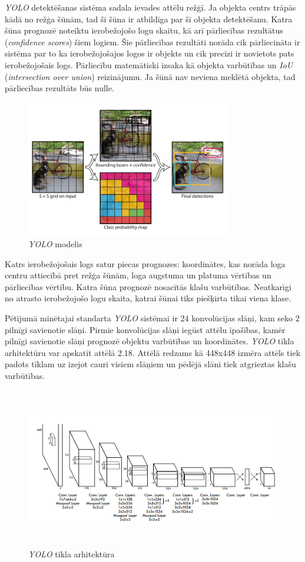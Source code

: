 \textit{YOLO} detektēšanas sistēma sadala ievades attēlu režģī. Ja objekta centrs trāpās kādā no režģa šūnām, tad šī šūna ir atbildīga par šī objekta detektēšanu. Katra šūna prognozē noteiktu ierobežojošo logu skaitu, kā arī pārliecības rezultātus (\textit{confidence scores}) šiem logiem. Šie pārliecības rezultāti norāda cik pārliecināta ir sistēma par to ka ierobežojošajos logos ir objekts un cik precīzi ir novietots pats ierobežojošais logs. Pārliecību matemātiski izsaka kā objekta varbūtības un \textit{IoU} (\textit{intersection over union}) reizinājumu. Ja šūnā nav neviena meklētā objekta, tad pārliecības rezultāts būs nulle.

\begin{figure}[H]%
	\centering
	\includegraphics[height=6cm]{images/yolo.png} %
	\caption{\textit{YOLO} modelis \cite{redmon2016you}}%
	\label{fig:example}%
\end{figure}

Katrs ierobežojošais logs satur piecas prognozes: koordinātes, kas norāda loga centru attiecībā pret režģa šūnām, loga augstuma un platuma vērtības un pārliecības vērtību. Katra šūna prognozē nosacītās klašu varbūtības. Neatkarīgi no atrasto ierobežojošo logu skaita, katrai šūnai tiks piešķirta tikai viena klase.

Pētījumā \cite{redmon2016you} minētajai standarta \textit{YOLO} sistēmai ir 24 konvolūcijas slāņi, kam seko 2 pilnīgi savienotie slāņi. Pirmie konvolūcijas slāņi iegūst attēlu īpašības, kamēr pilnīgi savienotie slāņi prognozē objektu varbūtības un koordinātes. \textit{YOLO} tīkla arhitektūru var apskatīt attēlā 2.18. Attēlā redzams kā 448x448 izmēra attēls tiek padots tīklam uz izejot cauri visiem slāņiem un pēdējā slāni tiek atgrieztas klašu varbūtības.

\begin{figure}[h]%
	\centering
	\includegraphics[height=7cm]{images/yoloarch.png} %
	\caption{\textit{YOLO} tīkla arhitektūra \cite{redmon2016you}}%
	\label{fig:example}%
\end{figure}

